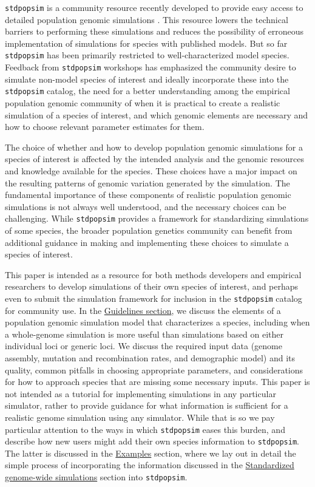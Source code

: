 \documentclass[hidelinks]{article}
\newcommand{\stdpopsim}{\texttt{stdpopsim}\xspace}
\begin{document}
\stdpopsim is a community resource recently developed to provide easy
access to detailed population genomic simulations \citep{Adrion2020}. This
resource lowers the technical barriers to performing these simulations
and reduces the possibility of erroneous implementation of simulations
for species with published models. But so far \stdpopsim has been
primarily restricted to well-characterized model species. Feedback from
\stdpopsim workshops has emphasized the community desire to simulate
non-model species of interest and ideally incorporate these into the \stdpopsim catalog,
the need for a better understanding among the empirical population
genomic community of when it is practical to create a realistic
simulation of a species of interest, and which genomic elements are
necessary and how to choose relevant parameter estimates for them.

The choice of whether and how to develop population genomic
simulations for a species of interest is affected by the intended
analysis and the genomic resources and knowledge available for the
species. These choices have a major impact on the resulting patterns of
genomic variation generated by the simulation. The fundamental
importance of these components of realistic population genomic
simulations is not always well understood, and the necessary choices can
be challenging. While \stdpopsim provides a framework for standardizing
simulations of some species, the broader population genetics community
can benefit from additional guidance in making and implementing these
choices to simulate a species of interest.

This paper is intended as a resource for both methods
developers and empirical researchers to develop simulations of their own
species of interest, and perhaps even to submit the simulation
framework for inclusion in the \stdpopsim catalog for community use.
In the \hyperref[sec:sim-guidelines]{Guidelines section}, 
we discuss the elements of a
population genomic simulation model that characterizes a
species, including when a whole-genome simulation is more useful than
simulations based on either individual loci or generic loci.
We discuss the required input data (genome assembly, 
mutation and recombination rates, and demographic model) and
its quality, common pitfalls in choosing appropriate parameters, and
considerations for how to approach species that are missing some
necessary inputs. This paper is not intended as a tutorial for
implementing simulations in any particular simulator, rather to provide
guidance for what information is sufficient for a realistic genome simulation
using any simulator. While that is so we pay particular attention to the ways
in which \stdpopsim eases this burden, and describe how new users might
add their own species information to \stdpopsim. 
The latter is discussed in the \hyperref[sec:examples]{Examples} section, where we lay out in
detail the simple process of incorporating the information discussed 
in the \hyperref[sec:sim-guidelines]{Standardized genome-wide simulations} section into \stdpopsim. 
\end{document}
